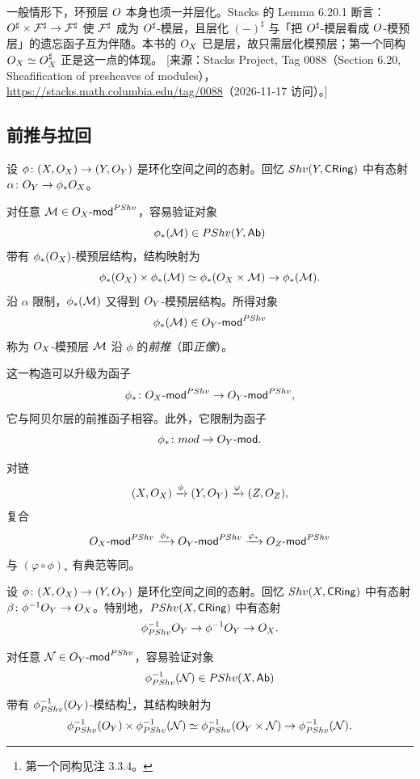 \begin{yizhu}
一般情形下，环预层 $O$ 本身也须一并层化。Stacks 的 Lemma 6.20.1 断言：$O^{\sharp}\times\mathcal{F}^{\sharp}\to\mathcal{F}^{\sharp}$ 使 $\mathcal{F}^{\sharp}$ 成为 $O^{\sharp}$-模层，且层化 $(-)^{\sharp}$ 与「把 $O^{\sharp}$-模层看成 $O$-模预层」的遗忘函子互为伴随。本书的 $O_X$ 已是层，故只需层化模预层；第一个同构 $O_X\simeq O_X^{\sharp}$ 正是这一点的体现。
[来源：Stacks Project, Tag 0088（Section 6.20, Sheafification of presheaves of modules），\url{https://stacks.math.columbia.edu/tag/0088}（2026-11-17 访问）。]
\end{yizhu}

\subsection{前推与拉回}\label{sec:12.3}

\begin{construction}\label{con:12.3.1}
设 $\phi\colon(X,O_X)\to(Y,O_Y)$ 是环化空间之间的态射。回忆 $Shv(Y,\mathsf{CRing})$ 中有态射 $\alpha\colon O_Y\to\phi_*O_X$。

对任意 $\mathcal{M}\in O_X\text{-}\mathsf{mod}^{PShv}$，容易验证对象
\[
\phi_*(\mathcal{M})\in PShv(Y,\mathsf{Ab})
\]
带有 $\phi_*(O_X)$-模预层结构，结构映射为
\[
\phi_*(O_X)\times\phi_*(\mathcal{M})\simeq\phi_*(O_X\times\mathcal{M})\to\phi_*(\mathcal{M}).
\]
沿 $\alpha$ 限制，$\phi_*(\mathcal{M})$ 又得到 $O_Y$-模预层结构。所得对象
\[
\phi_*(\mathcal{M})\in O_Y\text{-}\mathsf{mod}^{PShv}
\]
称为 $O_X$-模预层 $\mathcal{M}$ 沿 $\phi$ 的\emph{前推}（即\emph{正像}）。

这一构造可以升级为函子
\[
\phi_*\colon O_X\text{-}\mathsf{mod}^{PShv}\to O_Y\text{-}\mathsf{mod}^{PShv},
\]
它与阿贝尔层的前推函子相容。此外，它限制为函子
\[
\phi_*\colon mod\to O_Y\text{-}\mathsf{mod}.
\]
\end{construction}

\begin{construction}\label{con:12.3.2}
对链
\[
(X,O_X)\xrightarrow{\phi}(Y,O_Y)\xrightarrow{\varphi}(Z,O_Z),
\]
复合
\[
O_X\text{-}\mathsf{mod}^{PShv}\xrightarrow{\phi_*}O_Y\text{-}\mathsf{mod}^{PShv}\xrightarrow{\varphi_*}O_Z\text{-}\mathsf{mod}^{PShv}
\]
与 $(\varphi\circ\phi)_*$ 有典范等同。
\end{construction}

\begin{construction}\label{con:12.3.3}
设 $\phi\colon(X,O_X)\to(Y,O_Y)$ 是环化空间之间的态射。回忆 $Shv(X,\mathsf{CRing})$ 中有态射 $\beta\colon\phi^{-1}O_Y\to O_X$。特别地，$PShv(X,\mathsf{CRing})$ 中有态射
\[
\phi^{-1}_{PShv}O_Y\to\phi^{-1}O_Y\to O_X.
\]

对任意 $\mathcal{N}\in O_Y\text{-}\mathsf{mod}^{PShv}$，容易验证对象
\[
\phi^{-1}_{PShv}(\mathcal{N})\in PShv(X,\mathsf{Ab})
\]
带有 $\phi^{-1}_{PShv}(O_Y)$-模结构\footnote{第一个同构见注 3.3.4。}，其结构映射为
\[
\phi^{-1}_{PShv}(O_Y)\times\phi^{-1}_{PShv}(\mathcal{N})\simeq\phi^{-1}_{PShv}(O_Y\times\mathcal{N})\to\phi^{-1}_{PShv}(\mathcal{N}).
\]
\end{construction}

